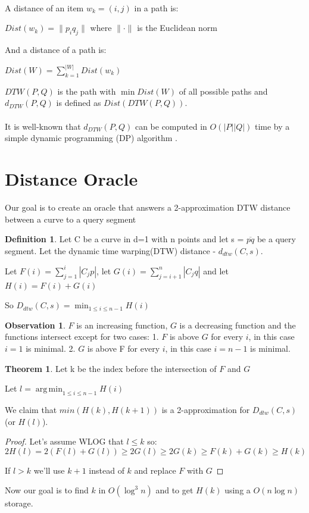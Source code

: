 \documentclass{article}
\theoremstyle{remark}
\DeclareMathOperator*{\argmin}{arg\,min}
\theoremstyle{definition}
\newtheorem{definition}{Definition}[section]
\newtheorem{observation}{Observation}[section]
\newtheorem{theorem}{Theorem}
\begin{document}
\paragraph{}

A distance of an item $w_k = (i, j)$ in a path is:
\begin{center}
    $Dist(w_k)=\lVert p_i q_j\rVert$ where $\lVert \cdot \rVert$ is the Euclidean norm
\end{center}

And a distance of a path is:
\begin{center}
    $Dist(W)=\sum_{k=1}^{|W|}{Dist(w_k)}$
\end{center}
$DTW(P,Q)$ is the path with $\min Dist(W)$ of all possible paths and $d_{DTW}(P, Q)$ is defined as $Dist(DTW(P,Q))$.
\paragraph{}
It is well-known that $d_{DTW}(P, Q)$ can be computed in $O(|P||Q|)$
time by a simple dynamic programming (DP) algorithm \cite{DBLP:journals/csr/Dietzfelbinger08}.

\section{Distance Oracle}
Our goal is to create an oracle that answers a 2-approximation DTW distance between a curve to a query segment
\begin{definition}
	Let C be a curve in d=1 with n points and let s = $\overline{pq}$ be a query segment. 
	Let the dynamic time warping(DTW) distance - $d_{dtw} (C, s)$. 
	
	Let $F(i)=\displaystyle\sum_{j=1}^{i}|C_j p|$,
	let $G(i)=\displaystyle\sum_{j=i+1}^{n}|C_j q|$ 
	and let $H(i)=F(i)+G(i)$
	
	So $D_{dtw}(C, s)=\displaystyle\min_{1\leq i\leq n-1}H(i)$
\end{definition}
\begin{observation}
	$F$ is an increasing function, 
	$G$ is a decreasing function and the functions intersect except for two cases: 1. $F$ is above $G$ for every $i$, in this case $i=1$ is minimal. 
	2. $G$ is above F for every $i$, in this case $i=n-1$ is minimal.
\end{observation}
\begin{theorem}
	Let k be the index before the intersection of $F$ and $G$
	
	Let $l=\argmin_{1\leq i\leq n-1}H(i)$
	
	We claim that $min(H(k), H(k+1))$ is a 2-approximation for $D_{dtw} (C, s)$ (or $H(l)$).
\end{theorem}
    \begin{proof}
    	Let's assume WLOG that $l\leq k$ so:
        $$2H(l)=2(F(l)+G(l))\geq 2G(l)\geq 2G(k)\geq F(k)+G(k)\geq H(k)$$
            
    	If $l>k$ we'll use $k+1$ instead of $k$ and replace $F$ with $G$
    \end{proof}
	Now our goal is to find $k$ in $O(\log^3n)$ and to get $H(k)$ using a $O(n\log n)$ storage.
	
\end{document}
